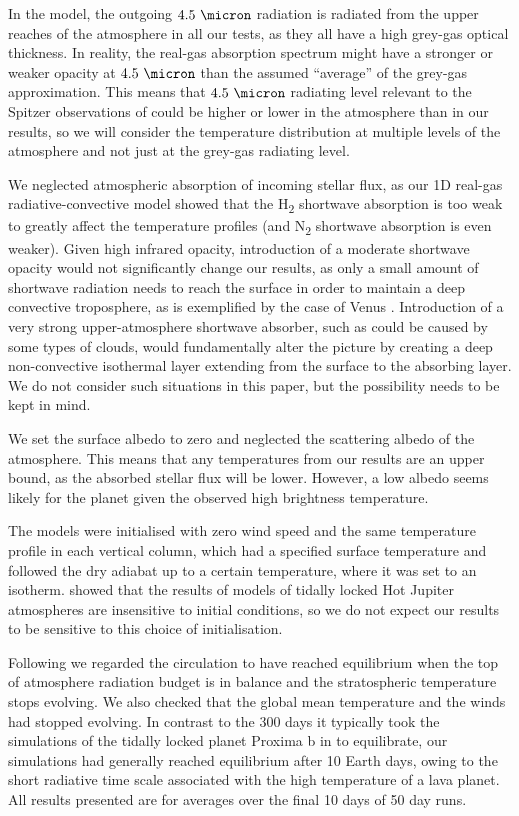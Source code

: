 In the model, the outgoing $4.5\ \micron$ radiation is radiated from the upper reaches of the atmosphere in all our tests, as they all have a high grey-gas optical thickness. In reality, the real-gas absorption spectrum might have a stronger or weaker opacity at $4.5\ \micron$ than the assumed ``average'' of the grey-gas approximation. This means that $4.5\ \micron$ radiating level relevant to the Spitzer observations of \citet{demory2016map} could be higher or lower in the atmosphere than in our results, so we will consider the temperature distribution at multiple levels of the atmosphere and not just at the grey-gas radiating level.

We neglected atmospheric absorption of incoming stellar flux, as our 1D real-gas radiative-convective model showed that the H\textsubscript{2} shortwave absorption is too weak to greatly affect the temperature profiles (and N\textsubscript{2} shortwave absorption is even weaker). Given high infrared opacity, introduction of a moderate shortwave opacity would not significantly change our results, as only a small amount of shortwave radiation needs to reach the surface in order to maintain a deep convective troposphere, as is exemplified by the case of Venus \citep[Ch. 4]{ClimateBook}.   Introduction of a very strong upper-atmosphere shortwave absorber, such as could be caused by some types of clouds,  would fundamentally alter the picture by creating a deep non-convective isothermal layer extending from the surface to the absorbing layer.  We do not consider such situations in this paper, but the possibility needs to be kept in mind.

We set the surface albedo to zero and neglected the scattering albedo of the atmosphere. This means that any temperatures from our results are an upper bound, as the absorbed stellar flux will be lower. However, a low albedo seems likely for the planet given the observed high brightness temperature.

The models were initialised with zero wind speed and the same temperature profile in each vertical column, which had a specified surface temperature and followed the dry adiabat up to a certain temperature, where it was set to an isotherm. \citet{liu2013atmospheric} showed that the results of models of tidally locked Hot Jupiter atmospheres are insensitive to initial conditions, so we do not expect our results to be sensitive to this choice of initialisation.

Following \citet{boutle2017proxima} we regarded the circulation to have reached equilibrium when the top of atmosphere radiation budget is in balance and the stratospheric temperature stops evolving.  We also checked that the global mean temperature and the winds had stopped evolving.  In contrast to the 300 days it typically took the simulations of the tidally locked planet Proxima b in \citet{boutle2017proxima} to equilibrate, our simulations had generally reached equilibrium after 10 Earth days, owing to the short radiative time scale associated with the high temperature of a lava planet. All results presented are for averages over the final 10 days of 50 day runs.

